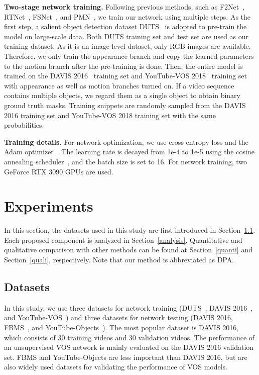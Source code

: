 \documentclass[10pt,twocolumn,letterpaper]{article}
\begin{document}
\vspace{1mm}
\noindent\textbf{Two-stage network training.} Following previous methods, such as F2Net~\cite{F2Net}, RTNet~\cite{RTNet}, FSNet~\cite{FSNet}, and PMN~\cite{PMN}, we train our network using multiple steps. As the first step, a salient object detection dataset DUTS~\cite{DUTS} is adopted to pre-train the model on large-scale data. Both DUTS training set and test set are used as our training dataset. As it is an image-level dataset, only RGB images are available. Therefore, we only train the appearance branch and copy the learned parameters to the motion branch after the pre-training is done. Then, the entire model is trained on the DAVIS 2016~\cite{DAVIS} training set and YouTube-VOS 2018~\cite{YTVOS} training set with appearance as well as motion branches turned on. If a video sequence contains multiple objects, we regard them as a single object to obtain binary ground truth masks. Training snippets are randomly sampled from the DAVIS 2016 training set and YouTube-VOS 2018 training set with the same probabilities.


\vspace{1mm}
\noindent\textbf{Training details.} For network optimization, we use cross-entropy loss and the Adam optimizer~\cite{adam}. The learning rate is decayed from 1e-4 to 1e-5 using the cosine annealing scheduler~\cite{cosine}, and the batch size is set to 16. For network training, two GeForce RTX 3090 GPUs are used. 


\section{Experiments}
In this section, the datasets used in this study are first introduced in Section~\ref{datasets}. Each proposed component is analyzed in Section~\ref{analysis}. Quantitative and qualitative comparison with other methods can be found at Section~\ref{quanti} and Section~\ref{quali}, respectively. Note that our method is abbreviated as DPA. 


\subsection{Datasets}
\label{datasets}
In this study, we use three datasets for network training (DUTS~\cite{DUTS}, DAVIS 2016~\cite{DAVIS}, and YouTube-VOS~\cite{YTVOS}) and three datasets for network testing (DAVIS 2016, FBMS~\cite{FBMS}, and YouTube-Objects~\cite{YTOBJ}). The most popular dataset is DAVIS 2016, which consists of 30 training videos and 30 validation videos. The performance of an unsupervised VOS network is mainly evaluated on the DAVIS 2016 validation set. FBMS and YouTube-Objects are less important than DAVIS 2016, but are also widely used datasets for validating the performance of VOS models. 
\end{document}
